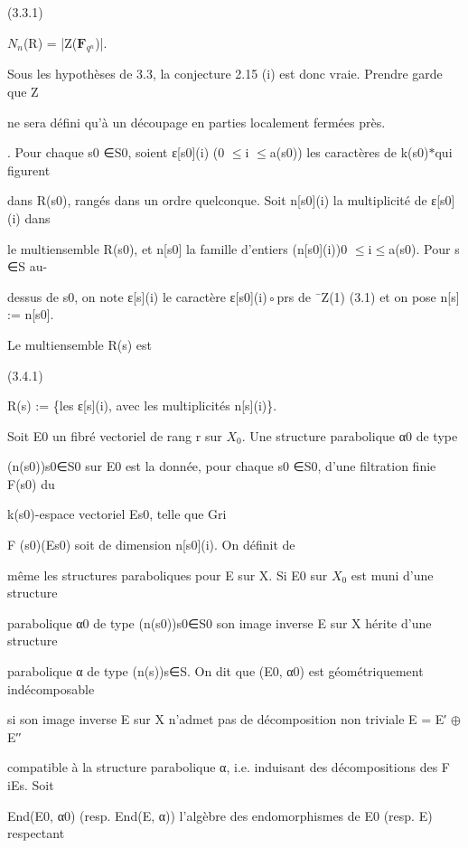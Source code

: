\documentclass[11pt]{article}
\begin{document}
\noindent (3.3.1)\par
\noindent \(N_n\)(R) = |Z(\(\mathbf F_{q^n}\))|.\par
\noindent Sous les hypothèses de 3.3, la conjecture 2.15 (i) est donc vraie. Prendre garde que Z\par
\noindent ne sera défini qu’à un découpage en parties localement fermées près.\par
\medskip
{}. Pour chaque s0 ∈S0, soient ε[s0](i) (0 \(\leq\)i \(\leq\)a(s0)) les caractères de k(s0)\(*\)qui figurent\par
\noindent dans R(s0), rangés dans un ordre quelconque. Soit n[s0](i) la multiplicité de ε[s0](i) dans\par
\noindent le multiensemble R(s0), et n[s0] la famille d’entiers (n[s0](i))0 \(\leq\)i\(\leq\)a(s0). Pour s ∈S au-\par
\noindent dessus de s0, on note ε[s](i) le caractère ε[s0](i)◦prs de ¯Z(1) (3.1) et on pose n[s] := n[s0].\par
\noindent Le multiensemble R(s) est\par
\noindent (3.4.1)\par
\noindent R(s) := \{les ε[s](i), avec les multiplicités n[s](i)\}.\par
\noindent Soit E0 un fibré vectoriel de rang r sur \(X_0\). Une structure parabolique α0 de type\par
\noindent (n(s0))s0∈S0 sur E0 est la donnée, pour chaque s0 ∈S0, d’une filtration finie F(s0) du\par
\noindent k(s0)-espace vectoriel Es0, telle que Gri\par
\noindent F (s0)(Es0) soit de dimension n[s0](i). On définit de\par
\noindent même les structures paraboliques pour E sur X. Si E0 sur \(X_0\) est muni d’une structure\par
\noindent parabolique α0 de type (n(s0))s0∈S0 son image inverse E sur X hérite d’une structure\par
\noindent parabolique α de type (n(s))s∈S. On dit que (E0, α0) est géométriquement indécomposable\par
\noindent si son image inverse E sur X n’admet pas de décomposition non triviale E = E′ \(\oplus\)E′′\par
\noindent compatible à la structure parabolique α, i.e. induisant des décompositions des F iEs. Soit\par
\noindent End(E0, α0) (resp. End(E, α)) l’algèbre des endomorphismes de E0 (resp. E) respectant\par
\end{document}
